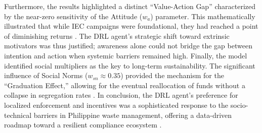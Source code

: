 Furthermore, the results highlighted a distinct ``Value-Action Gap'' characterized by the near-zero sensitivity of the Attitude ($w_a$) parameter. This mathematically illustrated that while IEC campaigns were foundational, they had reached a point of diminishing returns \citep{Zhao2022}. The DRL agent's strategic shift toward extrinsic motivators was thus justified; awareness alone could not bridge the gap between intention and action when systemic barriers remained high. Finally, the model identified social multipliers as the key to long-term sustainability. The significant influence of Social Norms ($w_{sn} \approx 0.35$) provided the mechanism for the ``Graduation Effect,'' allowing for the eventual reallocation of funds without a collapse in segregation rates \citep{Andre2021}. In conclusion, the DRL agent’s preference for localized enforcement and incentives was a sophisticated response to the socio-technical barriers in Philippine waste management, offering a data-driven roadmap toward a resilient compliance ecosystem \citep{Jimenez2025}.